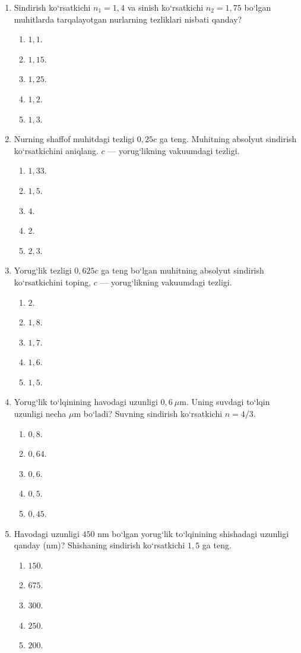 \begin{enumerate}
\item Sindirish ko‘rsatkichi $n_1=1,4$ va sinish ko‘rsatkichi $n_2=1,75$ bo‘lgan muhitlarda tarqalayotgan nurlarning tezliklari nisbati qanday?
\begin{enumerate}[label=\Alph*)]
\item $1,1$.
\item $1,15$.
\item $1,25$.
\item $1,2$.
\item $1,3$.
\end{enumerate}

\item Nurning shaffof muhitdagi tezligi $0,25c$ ga teng. Muhitning absolyut sindirish ko‘rsatkichini aniqlang. $c$ — yorug‘likning vakuumdagi tezligi.
\begin{enumerate}[label=\Alph*)]
\item $1,33$.
\item $1,5$.
\item $4$.
\item $2$.
\item $2,3$.
\end{enumerate}

\item Yorug‘lik tezligi $0,625c$ ga teng bo‘lgan muhitning absolyut sindirish ko‘rsatkichini toping, $c$ — yorug‘likning vakuumdagi tezligi.
\begin{enumerate}[label=\Alph*)]
\item $2$.
\item $1,8$.
\item $1,7$.
\item $1,6$.
\item $1,5$.
\end{enumerate}

\item Yorug‘lik to‘lqinining havodagi uzunligi $0,6~\mu$m. Uning suvdagi to‘lqin uzunligi necha $\mu$m bo‘ladi? Suvning sindirish ko‘rsatkichi $n=4/3$.
\begin{enumerate}[label=\Alph*)]
\item $0,8$.
\item $0,64$.
\item $0,6$.
\item $0,5$.
\item $0,45$.
\end{enumerate}

\item Havodagi uzunligi $450$ nm bo‘lgan yorug‘lik to‘lqinining shishadagi uzunligi qanday (nm)? Shishaning sindirish ko‘rsatkichi $1,5$ ga teng.
\begin{enumerate}[label=\Alph*)]
\item $150$.
\item $675$.
\item $300$.
\item $250$.
\item $200$.
\end{enumerate}


\end{enumerate}

